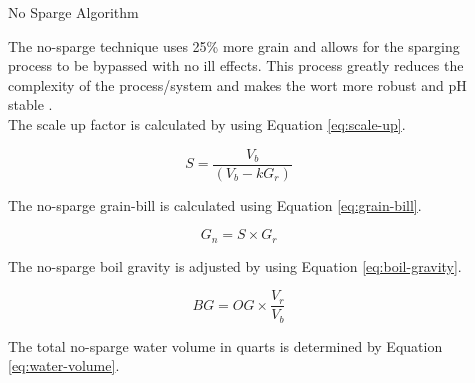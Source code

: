 \documentclass[final]{beamer}
\newlength{\sepwid}
\newlength{\onecolwid}
\newlength{\twocolwid}
\begin{document}
\begin{frame}[t]
\begin{columns}[t]
\begin{column}{\twocolwid}
\begin{columns}[t,totalwidth=\twocolwid]
\begin{column}{\onecolwid}

\end{column} %

\end{columns} %

\end{column} %

\begin{column}{\sepwid}\end{column} %

\begin{column}{\onecolwid} %


\begin{block}{No Sparge Algorithm}

The no-sparge technique uses 25\% more grain and allows for the sparging process to be bypassed with no ill effects.  This process greatly reduces the complexity of the process/system and makes the wort more robust and pH stable \cite{sparging}. \\

\noindent The scale up factor is calculated by using Equation \ref{eq:scale-up}.

\begin{equation}
S = \frac{V_{b}}{(V_{b} - kG_{r})}
\label{eq:scale-up}
\end{equation}

\noindent The no-sparge grain-bill is calculated using Equation \ref{eq:grain-bill}.

\begin{equation}
G_{n} = S \times G_{r}
\label{eq:grain-bill}
\end{equation}

\noindent The no-sparge boil gravity is adjusted by using Equation \ref{eq:boil-gravity}.

\begin{equation}
BG = OG \times \frac{V_{r}}{V_{b}}
\label{eq:boil-gravity}
\end{equation}

\noindent The total no-sparge water volume in quarts is determined by Equation \ref{eq:water-volume}.


\end{block}
\end{column}
\end{columns}
\end{frame}
\end{document}
